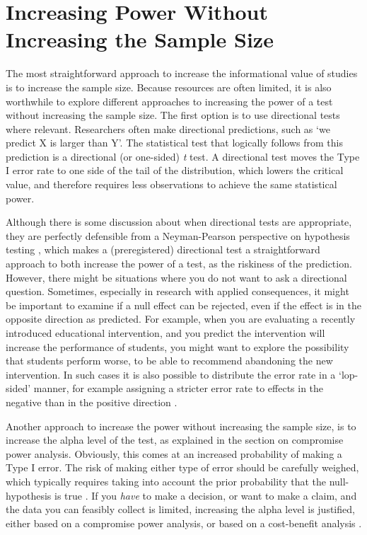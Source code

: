 \documentclass[
]{krantz}
\begin{document}
\hypertarget{increasing-power-without-increasing-the-sample-size}{%
\section{Increasing Power Without Increasing the Sample Size}\label{increasing-power-without-increasing-the-sample-size}}

The most straightforward approach to increase the informational value of studies is to increase the sample size. Because resources are often limited, it is also worthwhile to explore different approaches to increasing the power of a test without increasing the sample size. The first option is to use directional tests where relevant. Researchers often make directional predictions, such as `we predict X is larger than Y'. The statistical test that logically follows from this prediction is a directional (or one-sided) \emph{t} test. A directional test moves the Type I error rate to one side of the tail of the distribution, which lowers the critical value, and therefore requires less observations to achieve the same statistical power.

Although there is some discussion about when directional tests are appropriate, they are perfectly defensible from a Neyman-Pearson perspective on hypothesis testing \citep{cho_is_2013}, which makes a (preregistered) directional test a straightforward approach to both increase the power of a test, as the riskiness of the prediction. However, there might be situations where you do not want to ask a directional question. Sometimes, especially in research with applied consequences, it might be important to examine if a null effect can be rejected, even if the effect is in the opposite direction as predicted. For example, when you are evaluating a recently introduced educational intervention, and you predict the intervention will increase the performance of students, you might want to explore the possibility that students perform worse, to be able to recommend abandoning the new intervention. In such cases it is also possible to distribute the error rate in a `lop-sided' manner, for example assigning a stricter error rate to effects in the negative than in the positive direction \citep{rice_heads_1994}.

Another approach to increase the power without increasing the sample size, is to increase the alpha level of the test, as explained in the section on compromise power analysis. Obviously, this comes at an increased probability of making a Type I error. The risk of making either type of error should be carefully weighed, which typically requires taking into account the prior probability that the null-hypothesis is true \citep{cascio_open_1983, mudge_setting_2012, murphy_statistical_2014, miller_quest_2019}. If you \emph{have} to make a decision, or want to make a claim, and the data you can feasibly collect is limited, increasing the alpha level is justified, either based on a compromise power analysis, or based on a cost-benefit analysis \citep{field_minimizing_2004, baguley_understanding_2004}.
\end{document}
